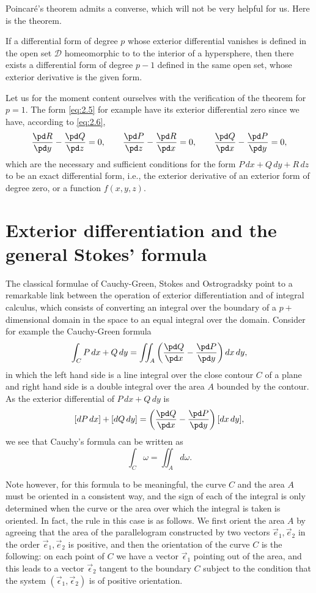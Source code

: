 Poincar\'e's theorem admits a converse, which will not be very helpful for us. Here is the theorem.
\begin{thm*}
  If a differential form of degree $p$ whose exterior differential vanishes is defined in the open set $\mathcal{D}$ homeomorphic to to the interior of a hypersphere, then there exists a differential form of degree $p-1$ defined in the same open set, whose exterior derivative is the given form.
\end{thm*}

Let us for the moment content ourselves with the verification of the theorem for $p=1$. The form \eqref{eq:2.5} for example have its exterior differential zero since we have, according to \eqref{eq:2.6},
\[
\frac{\pd R}{\pd y}-\frac{\pd Q}{\pd z}=0,\qquad
\frac{\pd P}{\pd z}-\frac{\pd R}{\pd x}=0,\qquad
\frac{\pd Q}{\pd x}-\frac{\pd P}{\pd y}=0,
\]
which are the necessary and sufficient conditions for the form $P\,dx+Q\,dy+R\,dz$ to be an exact differential form, {i.e.}, the exterior derivative of an exterior form of degree zero, or a function $f(x,y,z)$.

\section{Exterior differentiation and the general Stokes' formula}
\label{sec:exter-diff-gener}

\fsec The classical formulae of Cauchy-Green,  Stokes and  Ostrogradsky point to a remarkable link between the operation of exterior differentiation and  of integral calculus, which consists of converting an integral over the boundary of a $p+$ dimensional domain in the space to an equal integral over the domain. Consider for example the Cauchy-Green formula
\[
\int_{C}P\,dx+Q\,dy=\iint_{A}\left(\frac{\pd Q}{\pd x}-\frac{\pd P}{\pd y}\right)dx\,dy,
\]
in which the left hand side is a line integral over the close contour $C$ of a plane and  right hand side is a double integral over the area $A$ bounded by the contour. As the exterior differential of $P\,dx+Q\,dy$ is
\[
[dP\,dx]+[dQ\,dy]=\left(\frac{\pd Q}{\pd x}-\frac{\pd P}{\pd y}\right)[dx\,dy],
\]
we see that Cauchy's formula can be written as
\begin{equation}
  \label{eq:2.7}
  \int_{C}\omega=\iint_{A}d\omega.
\end{equation}

Note however, for this formula to be meaningful, the curve $C$ and the area $A$ must be oriented in a consistent way, and the sign of each of the integral is only determined when the curve or the area over which the integral is taken is oriented. In fact, the rule in this case is as follows. We first orient the area $A$ by agreeing that the area of the parallelogram constructed by two vectors $\vec{e}_{1}, \vec{e}_{2}$ in the order $\vec{e}_{1},\vec{e}_{2}$ is positive, and then the orientation of the curve $C$ is the following: on each point of $C$ we have a vector $\vec{\epsilon}_{1}$ pointing out of the area, and this leads to a vector $\vec{\epsilon}_{2}$ tangent to the boundary $C$ subject to the condition that the system $(\vec{\epsilon}_{1},\vec{\epsilon}_{2})$ is of positive orientation.

